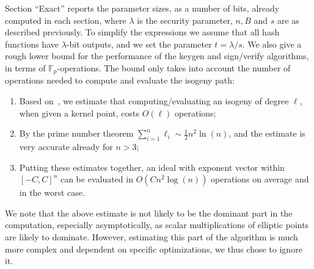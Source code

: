 \documentclass{llncs}
\newcommand{\F}{\mathbb{F}}
\begin{document}
Section ``Exact'' reports the parameter sizes, as a number of bits, already computed in each section, where
$\lambda$ is the security parameter, $n,B$ and $s$ are as described previously.
To simplify the expressions we assume that all hash functions have $\lambda$-bit outputs, and we set the parameter $t=\lambda/s$.
We also give a rough lower bound for the performance of the keygen and sign/verify algorithms, in terms of $\F_p$-operations.
The bound only takes into account the number of operations needed to compute and evaluate the isogeny path:
\begin{enumerate}
\item Based
  on~\cite{10.1007/978-3-319-70697-9_11,10.1007/978-3-319-79063-3_11},
  we estimate that computing/evaluating an isogeny of degree $\ell$, when given a kernel point,
  costs $O(\ell)$ operations;
\item By the prime number theorem $\sum_{i=1}^n\ell_i\sim\frac{1}{2}n^2\ln(n)$, and the estimate is very accurate already for $n>3$;
\item Putting these estimates together, an ideal with exponent vector within $[-C,C]^n$ can be evaluated in $O(Cn^2\log(n))$ operations on average and in the worst case.
\end{enumerate}
We note that the above estimate is not likely to be the dominant part in the computation, especially asymptotically,
as scalar multiplications of elliptic points are likely to dominate.
However, estimating this part of the algorithm is much more complex and dependent on specific optimizations, we thus chose to ignore it.
\end{document}
